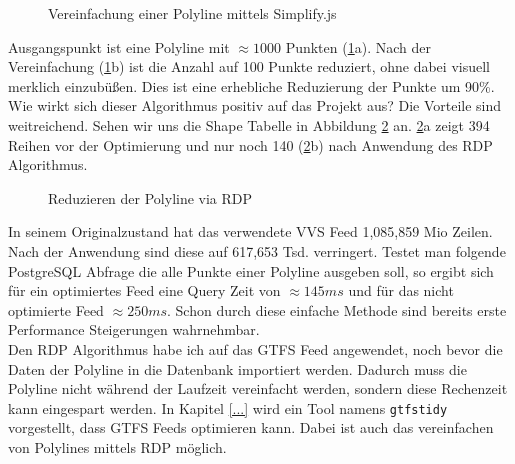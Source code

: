       \begin{figure}[htbp]
        \centering
        \hfill
        \caption{Vereinfachung einer Polyline mittels Simplify.js}
        \label{fig:simplify}
      \end{figure}

      Ausgangspunkt ist eine Polyline mit $\approx1000$ Punkten (\ref{fig:simplify}a). Nach der Vereinfachung (\ref{fig:simplify}b) ist die Anzahl auf 100 Punkte reduziert, ohne dabei visuell merklich einzubüßen. Dies ist eine erhebliche Reduzierung der Punkte um 90\%. Wie wirkt sich dieser Algorithmus positiv auf das Projekt aus? Die Vorteile sind weitreichend. Sehen wir uns die Shape Tabelle in Abbildung \ref{fig:shape_simplify} an. \ref{fig:shape_simplify}a zeigt 394 Reihen vor der Optimierung und nur noch 140 (\ref{fig:shape_simplify}b) nach Anwendung des RDP Algorithmus.

      \begin{figure}[htbp]
        \centering
        \hfill
        \caption{Reduzieren der Polyline via RDP}
        \label{fig:shape_simplify}
      \end{figure}

      In seinem Originalzustand hat das verwendete VVS Feed 1,085,859 Mio Zeilen. Nach der Anwendung sind diese auf 617,653 Tsd. verringert. Testet man folgende PostgreSQL Abfrage
      \colorbox{materialGrey}{\texttt{}}
      die alle Punkte einer Polyline ausgeben soll, so ergibt sich für ein optimiertes Feed eine Query Zeit von $\approx145 ms$ und für das nicht optimierte Feed $\approx250 ms$. Schon durch diese einfache Methode sind bereits erste Performance Steigerungen wahrnehmbar.\\

      Den RDP Algorithmus habe ich auf das GTFS Feed angewendet, noch bevor die Daten der Polyline in die Datenbank importiert werden. Dadurch muss die Polyline nicht während der Laufzeit vereinfacht werden, sondern diese Rechenzeit kann eingespart werden. In Kapitel \ref{...} wird ein Tool namens \texttt{gtfstidy} vorgestellt, dass GTFS Feeds optimieren kann. Dabei ist auch das vereinfachen von Polylines mittels RDP möglich.

